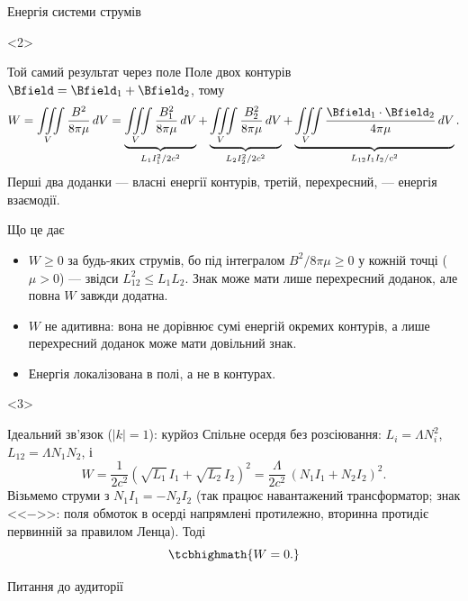 \documentclass[onlytextwidth]{beamer}
\begin{document}
\begin{frame}{Енергія системи струмів}{}
\begin{onlyenv}
	\end{onlyenv}
	\begin{onlyenv}
	\begin{block}{Той самий результат через поле}\justifying
		Поле двох контурів $\Bfield = \Bfield_1 + \Bfield_2$, тому
		\begin{equation*}
			W = \iiint\limits_V \frac{B^2}{8\pi\mu}\,dV
			= \underbrace{\iiint\limits_V \frac{B_1^2}{8\pi\mu}\,dV}_{L_1I_1^2/2c^2}
			+ \underbrace{\iiint\limits_V \frac{B_2^2}{8\pi\mu}\,dV}_{L_2I_2^2/2c^2}
			+ \underbrace{\iiint\limits_V \frac{\Bfield_1\cdot\Bfield_2}{4\pi\mu}\,dV}_{L_{12}I_1I_2/c^2}.
		\end{equation*}
		Перші два доданки --- власні енергії контурів, третій, \alert{перехресний}, --- енергія взаємодії.
	\end{block}
	\begin{block}{Що це дає}\justifying
		\begin{itemize}
			\item $W \ge 0$ за будь-яких струмів, бо під інтегралом $B^2/8\pi\mu \ge 0$ у кожній точці ($\mu>0$) --- звідси $L_{12}^2 \le L_1L_2$. Знак може мати лише перехресний доданок, але повна $W$ завжди додатна.
			\item $W$ \alert{не адитивна}: вона не дорівнює сумі енергій окремих контурів, а лише перехресний доданок може мати довільний знак.
			\item Енергія локалізована в полі, а не в контурах.
		\end{itemize}
	\end{block}
	\end{onlyenv}
	\begin{onlyenv}
	\begin{block}{Ідеальний зв'язок ($|k| = 1$): курйоз}\justifying
		Спільне осердя без розсіювання: $L_i = \Lambda N_i^2$, $L_{12} = \Lambda N_1N_2$, і
		\begin{equation*}
			W = \frac{1}{2c^2}\left(\sqrt{L_1}\,I_1 + \sqrt{L_2}\,I_2\right)^2 = \frac{\Lambda}{2c^2}\,(N_1I_1 + N_2I_2)^2 .
		\end{equation*}
		Візьмемо струми з $N_1I_1 = -N_2I_2$ (так працює навантажений трансформатор; знак <<$-$>>: поля обмоток в осерді напрямлені протилежно, вторинна протидіє первинній за правилом Ленца). Тоді
		\begin{equation*}
			\tcbhighmath{W = 0 .}
		\end{equation*}
	\end{block}
	\begin{alertblock}{Питання до аудиторії}\justifying

\end{alertblock}
\end{onlyenv}
\end{frame}
\end{document}
